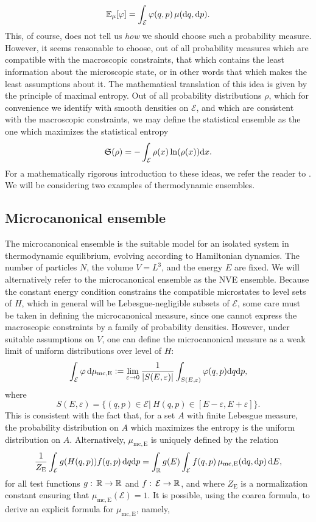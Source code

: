 \begin{equation}
    \label{eq:ensemble_average}
    \mathbb{E}_\mu[\varphi]=\int_{\mathcal E} \varphi(q,p)\,\mu(\mathrm{d} q,\mathrm{d} p).
\end{equation}
This, of course, does not tell us \textit{how} we should choose such a probability measure.
However, it seems reasonable to choose, out of all probability measures which are compatible with the macroscopic constraints,
 that which contains the least information about the microscopic state, or in other words that which makes the least assumptions about it.
The mathematical translation of this idea is given by the principle of maximal entropy. Out of all probability distributions $\rho$, which for convenience we identify with smooth densities on $\mathcal E$, and which are consistent with the macroscopic constraints,
we may define the statistical ensemble as the one which maximizes the statistical entropy
\begin{equation}
    \label{eq:entropy}
    \mathfrak S(\rho)=-\int_{\mathcal E} \rho(x)\ln(\rho(x))\mathrm{d}x.
\end{equation}
For a mathematically rigorous introduction to these ideas, we refer the reader to \cite[Chapter 3]{E07}.
We will be considering two examples of thermodynamic ensembles.
\subsection{Microcanonical ensemble}
    The microcanonical ensemble is the suitable model for an isolated system in thermodynamic equilibrium, evolving according to Hamiltonian dynamics. The number of particles $N$, the volume $V=L^3$, and the energy $E$ are fixed. We will alternatively refer to the microcanonical ensemble as the NVE ensemble.
     Because the constant energy condition constrains the compatible microstates to level sets of $H$, which in general will be Lebesgue-negligible subsets of $\mathcal E$, some care must be taken in defining the microcanonical measure, since one cannot express the macroscopic constraints by a family of probability densities.
      However, under suitable assumptions on $V$, one can define the microcanonical measure as a weak limit of uniform distributions over level  of $H$:
    $$\int_\mathcal{E} \varphi\, \mathrm{d}\mu_{\mathrm{mc,E}} \mathrel{\mathop:}= \underset{\varepsilon \to 0}{\mathrm{lim}}\, \frac{1}{|S(E,\varepsilon)|}\int_{S(E,\varepsilon)} \varphi(q,p) \mathrm{d} q \mathrm{d} p,$$
    where 
    $$S(E,\varepsilon) = \{ (q,p) \in \mathcal E |\ H(q,p) \in [E-\varepsilon,E+\varepsilon]\}.$$
    This is consistent with the fact that, for a set $A$ with finite Lebesgue measure, the probability distribution on $A$ which maximizes the entropy is the uniform distribution on $A$. 
    Alternatively, $\mu_{\mathrm{mc,E}}$ is uniquely defined by the relation
    \[\frac{1}{Z_\mathrm{E}}\int_{\mathcal E}g(H(q,p))f(q,p)\,\mathrm{d}q\mathrm{d}p=\int_{\mathbb{R}}g(E)\int_{\mathcal E} f(q,p)\,\mu_{\mathrm{mc,E}}(\mathrm{d} q,\mathrm{d}p)\,\mathrm{d} E,\]
    for all test functions $g:\,\mathbb{R}\to \mathbb{R}$ and $f:\,\mathcal E\to \mathbb{R}$, and where $Z_{\mathrm{E}}$ is a normalization constant ensuring that $\mu_{\mathrm{mc,E}}(\mathcal E)=1$.
    It is possible, using the coarea formula, to derive an explicit formula for $\mu_{\mathrm{mc,E}}$, namely,

